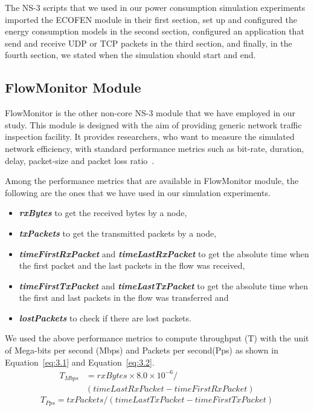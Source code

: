 The NS-3 scripts that we used in our power consumption simulation experiments imported the ECOFEN module in their first section, set up and configured the energy consumption models in the second section, configured an application that send and receive UDP or TCP packets in the third section, and finally, in the fourth section, we stated when the simulation should start and end. 

\subsection{FlowMonitor Module}
FlowMonitor is the other non-core NS-3 module that we have employed in our study. This module is designed with the aim of providing generic network traffic inspection facility. It provides researchers, who want to measure the simulated network efficiency, with standard performance metrics such as bit-rate, duration, delay, packet-size and packet loss ratio~\cite{DBLP:conf/valuetools/CarneiroFR09}.  

Among the performance metrics that are available in FlowMonitor module, the following are the ones that we have used in our simulation experiments.
\begin{itemize}
	\item \textbf{\textit{rxBytes}} to get the received bytes by a node,
	\item \textbf{\textit{txPackets}} to get the transmitted packets by a node,
	\item \textbf{\textit{timeFirstRxPacket}} and \textbf{\textit{timeLastRxPacket}} to get the absolute time when the first packet and the last packets in the flow was received,
	\item  \textbf{\textit{timeFirstTxPacket}} and \textbf{\textit{timeLastTxPacket}} to get the absolute time when the first and last packets in the flow was transferred and 
	\item \textbf{\textit{lostPackets}} to check if there are lost packets.
\end{itemize}
We used the above performance metrics to compute throughput (T) with the unit of Mega-bits per second (Mbps) and Packets per second(Pps) as shown in Equation~\ref{eq:3.1} and Equation~\ref{eq:3.2}. 
\begin{equation} \label{eq:3.1}
\begin{split}
T_{Mbps} &= rxBytes \times 8.0 \times 10^{-6} /\\
  & (timeLastRxPacket - timeFirstRxPacket)
\end{split}
\end{equation}
\begin{equation} \label{eq:3.2}
T_{Pps} = txPackets / (timeLastTxPacket - timeFirstTxPacket)
\end{equation}
